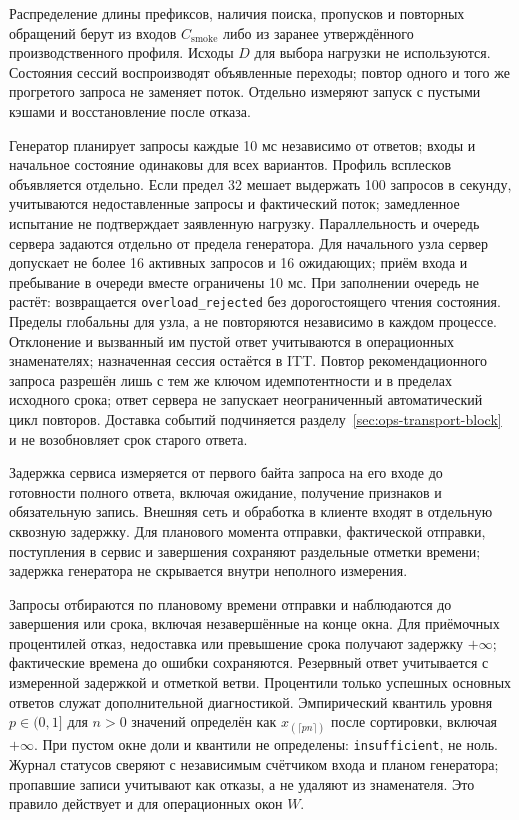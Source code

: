 \documentclass[12pt,a4paper]{article}
\newcommand{\code}[1]{{\ttfamily\small\nolinkurl{#1}}}
\theoremstyle{plainru}
\begin{document}
Распределение длины префиксов, наличия поиска, пропусков и повторных
обращений берут из входов $C_{\mathrm{smoke}}$ либо из заранее утверждённого
производственного профиля. Исходы $D$ для выбора нагрузки не используются.
Состояния сессий воспроизводят объявленные переходы;
повтор одного и того же прогретого запроса не заменяет поток.
Отдельно измеряют запуск с пустыми кэшами и восстановление после отказа.

Генератор планирует запросы каждые 10 мс независимо от ответов;
входы и начальное состояние одинаковы для всех вариантов.
Профиль всплесков объявляется отдельно. Если предел 32 мешает выдержать
100 запросов в секунду, учитываются недоставленные запросы и фактический
поток; замедленное испытание не подтверждает заявленную нагрузку.
Параллельность и очередь сервера задаются отдельно от предела генератора.
Для начального узла сервер допускает не более 16 активных запросов
и 16 ожидающих; приём входа и пребывание в очереди вместе ограничены 10 мс.
При заполнении очередь не растёт: возвращается
\code{overload_rejected} без дорогостоящего чтения состояния.
Пределы глобальны для узла, а не повторяются независимо в каждом
процессе. Отклонение и вызванный им пустой ответ учитываются
в операционных знаменателях; назначенная сессия остаётся в ITT.
Повтор рекомендационного запроса разрешён лишь с тем же ключом идемпотентности
и в пределах исходного срока; ответ сервера не запускает
неограниченный автоматический цикл повторов. Доставка событий подчиняется
разделу~\ref{sec:ops-transport-block} и не возобновляет срок старого ответа.

Задержка сервиса измеряется от первого байта запроса на его входе
до готовности полного ответа, включая ожидание, получение признаков
и обязательную запись. Внешняя сеть и обработка в клиенте входят
в отдельную сквозную задержку. Для планового момента отправки,
фактической отправки, поступления в сервис и завершения сохраняют
раздельные отметки времени; задержка генератора не скрывается
внутри неполного измерения.

Запросы отбираются по плановому времени отправки и наблюдаются
до завершения или срока, включая незавершённые на конце окна.
Для приёмочных процентилей отказ, недоставка или превышение срока
получают задержку $+\infty$; фактические времена до ошибки сохраняются.
Резервный ответ учитывается с измеренной задержкой и отметкой ветви.
Процентили только успешных основных ответов служат дополнительной диагностикой.
Эмпирический квантиль уровня $p\in(0,1]$ для $n>0$ значений
определён как $x_{(\lceil pn\rceil)}$ после сортировки, включая $+\infty$.
При пустом окне доли и квантили не определены: \code{insufficient},
не ноль. Журнал статусов сверяют с независимым счётчиком входа и
планом генератора; пропавшие записи учитывают как отказы, а не удаляют
из знаменателя. Это правило действует и для операционных окон $W$.
\end{document}
